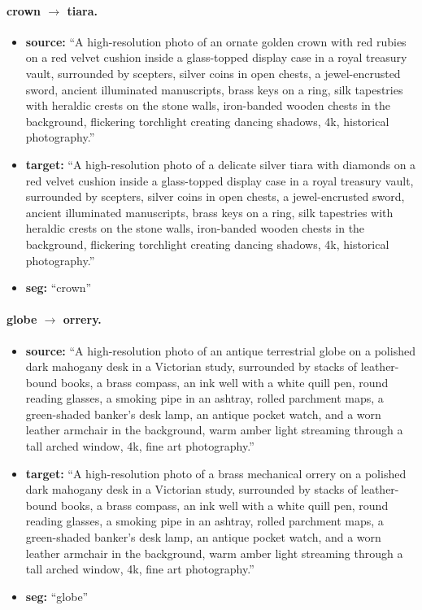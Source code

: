 \paragraph{crown $\to$ tiara.}
\begin{itemize}
    \item \textbf{source:} ``A high-resolution photo of an ornate golden crown with red rubies on a red velvet cushion inside a glass-topped display case in a royal treasury vault, surrounded by scepters, silver coins in open chests, a jewel-encrusted sword, ancient illuminated manuscripts, brass keys on a ring, silk tapestries with heraldic crests on the stone walls, iron-banded wooden chests in the background, flickering torchlight creating dancing shadows, 4k, historical photography.''
    \item \textbf{target:} ``A high-resolution photo of a delicate silver tiara with diamonds on a red velvet cushion inside a glass-topped display case in a royal treasury vault, surrounded by scepters, silver coins in open chests, a jewel-encrusted sword, ancient illuminated manuscripts, brass keys on a ring, silk tapestries with heraldic crests on the stone walls, iron-banded wooden chests in the background, flickering torchlight creating dancing shadows, 4k, historical photography.''
    \item \textbf{seg:} ``crown''
\end{itemize}

\paragraph{globe $\to$ orrery.}
\begin{itemize}
    \item \textbf{source:} ``A high-resolution photo of an antique terrestrial globe on a polished dark mahogany desk in a Victorian study, surrounded by stacks of leather-bound books, a brass compass, an ink well with a white quill pen, round reading glasses, a smoking pipe in an ashtray, rolled parchment maps, a green-shaded banker's desk lamp, an antique pocket watch, and a worn leather armchair in the background, warm amber light streaming through a tall arched window, 4k, fine art photography.''
    \item \textbf{target:} ``A high-resolution photo of a brass mechanical orrery on a polished dark mahogany desk in a Victorian study, surrounded by stacks of leather-bound books, a brass compass, an ink well with a white quill pen, round reading glasses, a smoking pipe in an ashtray, rolled parchment maps, a green-shaded banker's desk lamp, an antique pocket watch, and a worn leather armchair in the background, warm amber light streaming through a tall arched window, 4k, fine art photography.''
    \item \textbf{seg:} ``globe''
\end{itemize}

